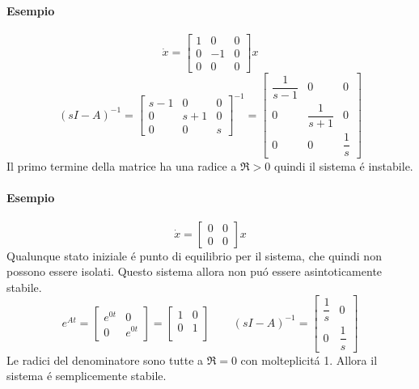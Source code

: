\documentclass[../main.tex]{subfiles}
\begin{document}
		\begin{mdframed}[style=Esempio]
			\paragraph{Esempio}
			\[
				\dot x =
				\begin{bmatrix}
					1 & 0 & 0\\
					0 & -1 & 0\\
					0 & 0 & 0
				\end{bmatrix} x
			\]
			\[
				(sI-A)^{-1} =
				\begin{bmatrix}
					s-1 & 0 & 0\\
					0 & s+1 & 0\\
					0 & 0 & s
				\end{bmatrix}^{-1} =
				\begin{bmatrix}
					\dfrac{1}{s-1} & 0 & 0\\
					0 & \dfrac{1}{s+1} & 0\\
					0 & 0 & \dfrac{1}{s}
				\end{bmatrix}
			\]
			Il primo termine della matrice ha una radice a $ \Re > 0 $ quindi il sistema \'e instabile.
		\end{mdframed}

		\begin{mdframed}[style=Esempio]
			\paragraph{Esempio}
			\label{esempio:semplicemente_stabile}
			\[
				\dot x =
				\begin{bmatrix}
					0 & 0\\
					0 & 0
				\end{bmatrix} x
			\]
			Qualunque stato iniziale \'e punto di equilibrio per il sistema, che quindi non possono essere isolati. Questo sistema allora non pu\'o essere asintoticamente stabile.
			\[
				e^{At} =
				\begin{bmatrix}
					e^{0t} & 0\\
					0 & e^{0t}
				\end{bmatrix} =
				\begin{bmatrix}
					1 & 0\\
					0 & 1\\
				\end{bmatrix} \qquad
				(sI-A)^{-1} = 
				\begin{bmatrix}
					\dfrac{1}{s} & 0\\
					0 & \dfrac{1}{s} 
				\end{bmatrix}
			\]
			Le radici del denominatore sono tutte a $ \Re = 0 $ con molteplicit\'a 1. Allora il sistema \'e semplicemente stabile.
		\end{mdframed}
	
\end{document}
